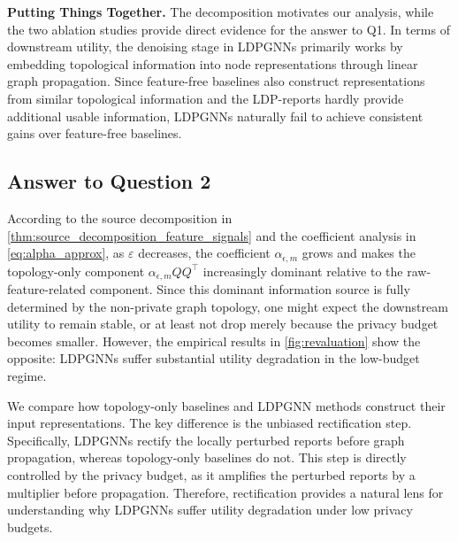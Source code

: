 \documentclass[conference,compsoc]{IEEEtran}
\theoremstyle{boldplain}
\theoremstyle{bolddefinition}
\theoremstyle{remark}
\newcommand{\mypara}[1]{\noindent\textbf{#1.}\xspace}
\newcommand{\ldpgnn}{LDPGNN\xspace}
\newcommand{\ldpgnns}{LDPGNNs\xspace}
\begin{document}
\vspace{0.1cm}

\mypara{Putting Things Together} 
\textcolor{purple!80}{The decomposition motivates our analysis, while the two ablation studies provide direct evidence for the answer to Q1.}
In terms of downstream utility, the denoising stage in \ldpgnns primarily works by embedding topological information into node representations through linear graph propagation. 
Since feature-free baselines also construct representations from similar topological information and the LDP-reports hardly provide additional usable information, \ldpgnns naturally fail to achieve consistent gains over feature-free baselines.

\subsection{Answer to Question 2}
\label{subsec:ans_2}

According to the source decomposition in \autoref{thm:source_decomposition_feature_signals} and the coefficient analysis in \autoref{eq:alpha_approx}, as $\varepsilon$ decreases, the coefficient $\alpha_{\epsilon,m}$ grows and makes the topology-only component $\alpha_{\epsilon,m}QQ^\top$ increasingly dominant relative to the raw-feature-related component. 
Since this dominant information source is fully determined by the non-private graph topology, one might expect the downstream utility to remain stable, or at least not drop merely because the privacy budget becomes smaller.
However, the empirical results in \autoref{fig:revaluation} show the opposite: \ldpgnns suffer substantial utility degradation in the low-budget regime. 



We compare how topology-only baselines and \ldpgnn methods construct their input representations. 
The key difference is the unbiased rectification step.
Specifically, \ldpgnns rectify the locally perturbed reports before graph propagation, whereas topology-only baselines do not. 
This step is directly controlled by the privacy budget, as it amplifies the perturbed reports by a multiplier before propagation. 
Therefore, rectification provides a natural lens for understanding why \ldpgnns suffer utility degradation under low privacy budgets.
\end{document}
